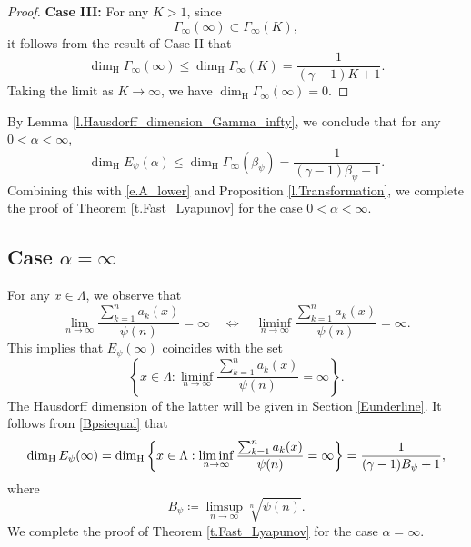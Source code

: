 \documentclass[12pt,reqno]{amsart}
\renewcommand{\=}{\coloneqq}
\theoremstyle{plain}
\begin{document}
\begin{proof}
\textbf{Case III: } For any $K>1$, since
  \begin{equation*}
           {\Gamma}_{\infty}(\infty)\subset
           {\Gamma}_{\infty}(K),
        \end{equation*}
it follows from the result of Case II that
        \begin{equation*}
            \dim_{\mathrm{H}}{\Gamma}_{\infty}(\infty)
            \leq \dim_{\mathrm{H}}{\Gamma}_{\infty}(K)=\frac{1}{(\gamma-1)K+1}.
        \end{equation*}
Taking the limit as $K\to \infty$, we have $\dim_{\mathrm{H}}{\Gamma}_{\infty}(\infty)=0$.
\end{proof}


By Lemma \ref{l.Hausdorff_dimension_Gamma_infty}, we conclude that for any $0<\alpha<\infty$,
        \begin{equation*}\label{e.A_upper}
               \dim_{\mathrm{H}}E_{\psi}(\alpha)\leq \dim_{\mathrm{H}}{\Gamma}_{\infty}(\beta_\psi)=\frac{1}{(\gamma-1)\beta_\psi+1}.
        \end{equation*}
Combining this with \eqref{e.A_lower} and Proposition \ref{l.Transformation}, we complete the proof of Theorem \ref{t.Fast_Lyapunov} for the case $0<\alpha<\infty$.


\subsection{Case $\alpha =\infty$}
For any $x\in \Lambda$, we observe that
\[
\lim_{n\to \infty} \frac{\sum^n_{k=1}a_k(x)}{\psi(n)} =\infty \quad \Longleftrightarrow\quad \liminf_{n\to \infty} \frac{\sum^n_{k=1}a_k(x)}{\psi(n)} =\infty.
\]
This implies that $E_\psi(\infty)$ coincides with the set
\[
\left\{x\in \Lambda: \liminf_{n\to \infty} \frac{\sum^n_{k=1}a_k(x)}{\psi(n)} =\infty\right\}.
\]
The Hausdorff dimension of the latter will be given in Section \ref{Eunderline}. It follows from \eqref{Bpsiequal} that
\begin{equation*}
\dim_{\rm H}E_\psi(\infty)=\dim_{\rm H}\left\{x\in \Lambda: \liminf_{n\to \infty} \frac{\sum^n_{k=1}a_k(x)}{\psi(n)} =\infty\right\}=\frac{1}{(\gamma-1)B_\psi+1},
 \end{equation*}
where
\begin{equation*}
   B_\psi\coloneqq \limsup_{n\to \infty}\sqrt[n]{\psi(n)}.
\end{equation*}
We complete the proof of Theorem \ref{t.Fast_Lyapunov} for the case $\alpha =\infty$.
\end{document}
